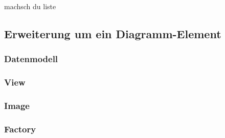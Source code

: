 machsch du liste

\subsection{Erweiterung um ein Diagramm-Element}
\subsubsection{Datenmodell}
\subsubsection{View}
\subsubsection{Image}
\subsubsection{Factory}
